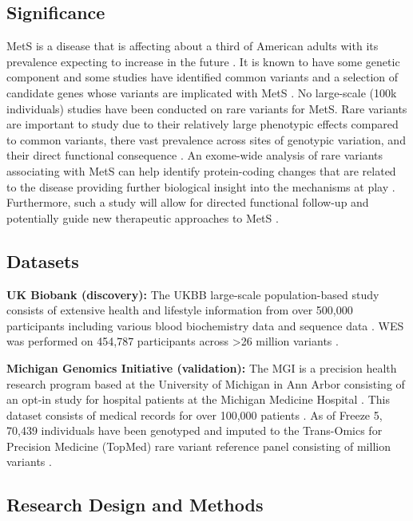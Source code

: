 \documentclass[11pt]{article}
\begin{document}
\subsection*{Significance}

MetS is a disease that is affecting about a third of American adults with its prevalence expecting to increase in the future \cite{pmid29480368}. It is known to have some genetic component and some studies have identified common variants and a selection of candidate genes whose variants are implicated with MetS \cite{pmid31589552}. No large-scale (\>100k individuals) studies have been conducted on rare variants for MetS. Rare variants are important to study due to their relatively large phenotypic effects compared to common variants, there vast prevalence across sites of genotypic variation, and their direct functional consequence \cite{pmid22863193,pmid34662886,KARCZEWSKI2022100168}. An exome-wide analysis of rare variants associating with MetS can help identify protein-coding changes that are related to the disease providing further biological insight into the mechanisms at play \cite{KARCZEWSKI2022100168,pmid34662886,Lee2018}. Furthermore, such a study will allow for directed functional follow-up and potentially guide new therapeutic approaches to MetS \cite{doi:10.1056/NEJMoa2117872}.

\subsection*{Datasets}

\textbf{UK Biobank (discovery):} The UKBB large-scale population-based study consists of extensive health and lifestyle information from over 500,000 participants including various blood biochemistry data and sequence data \cite{pmid34662886}. WES was performed on 454,787 participants across >26 million variants \cite{pmid34662886}.

\textbf{Michigan Genomics Initiative (validation):} The MGI is a precision health research program based at the University of Michigan in Ann Arbor consisting of an opt-in study for hospital patients at the Michigan Medicine Hospital \cite{Zawistowski2023}. This dataset consists of medical records for over 100,000 patients \cite{Zawistowski2023}. As of Freeze 5, 70,439 individuals have been genotyped and imputed to the Trans-Omics for Precision Medicine (TopMed) rare variant reference panel consisting of  million variants \cite{Zawistowski2023}.


\subsection*{Research Design and Methods}
\end{document}

